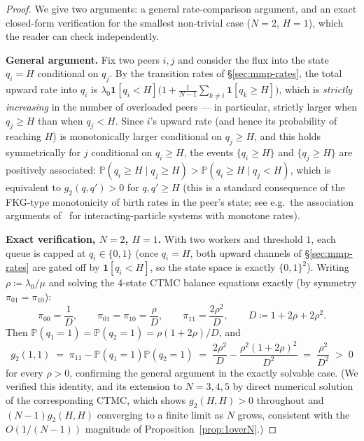 \documentclass[11pt,a4paper]{report}
\newcommand{\gtwo}{g_2}
\newcommand{\bP}{\mathbb{P}}
\begin{document}
\begin{proof}
We give two arguments: a general rate-comparison argument, and an
exact closed-form verification for the smallest non-trivial case
($N=2$, $H=1$), which the reader can check independently.

\medskip
\noindent\textbf{General argument.} Fix two peers $i,j$ and consider
the flux into the state $q_i = H$ conditional on $q_j$. By the
transition rates of \S\ref{sec:mmp-rates}, the total upward rate into
$q_i$ is $\lambda_0\mathbf{1}[q_i<H]\bigl(1 + \frac{1}{N-1}\sum_{k\neq i}
\mathbf{1}[q_k \geq H]\bigr)$, which is \emph{strictly increasing} in
the number of overloaded peers --- in particular, strictly larger when
$q_j \geq H$ than when $q_j < H$. Since $i$'s upward rate (and hence its
probability of reaching $H$) is monotonically larger conditional on
$q_j \geq H$, and this holds symmetrically for $j$ conditional on
$q_i \geq H$, the events $\{q_i \geq H\}$ and $\{q_j \geq H\}$ are
positively associated: $\bP(q_i \geq H \mid q_j \geq H) >
\bP(q_i \geq H \mid q_j < H)$, which is equivalent to
$\gtwo(q,q') > 0$ for $q,q' \geq H$ (this is a standard consequence of
the FKG-type monotonicity of birth rates in the peer's state; see
e.g.\ the association arguments of~\cite{liggett1985} for
interacting-particle systems with monotone rates).

\medskip
\noindent\textbf{Exact verification, $N=2$, $H=1$.} With two workers
and threshold $1$, each queue is capped at $q_i \in \{0,1\}$ (once
$q_i = H$, both upward channels of \S\ref{sec:mmp-rates} are gated off
by $\mathbf{1}[q_i<H]$, so the state space is exactly
$\{0,1\}^2$). Writing $\rho \coloneqq \lambda_0/\mu$ and solving the
$4$-state CTMC balance equations exactly (by symmetry $\pi_{01}=\pi_{10}$):
\[
  \pi_{00} = \frac{1}{D}, \qquad
  \pi_{01} = \pi_{10} = \frac{\rho}{D}, \qquad
  \pi_{11} = \frac{2\rho^2}{D}, \qquad
  D \coloneqq 1 + 2\rho + 2\rho^2.
\]
Then $\bP(q_1{=}1) = \bP(q_2{=}1) = \rho(1+2\rho)/D$, and
\[
  \gtwo(1,1) \;=\; \pi_{11} - \bP(q_1{=}1)\bP(q_2{=}1)
  \;=\; \frac{2\rho^2}{D} - \frac{\rho^2(1+2\rho)^2}{D^2}
  \;=\; \frac{\rho^2}{D^2}
  \;>\; 0
\]
for every $\rho > 0$, confirming the general argument in the exactly
solvable case. (We verified this identity, and its extension to
$N=3,4,5$ by direct numerical solution of the corresponding CTMC, which
shows $\gtwo(H,H) > 0$ throughout and $(N-1)\gtwo(H,H)$ converging to a
finite limit as $N$ grows, consistent with the $O(1/(N{-}1))$ magnitude
of Proposition~\ref{prop:1overN}.)
\end{proof}
\end{document}
